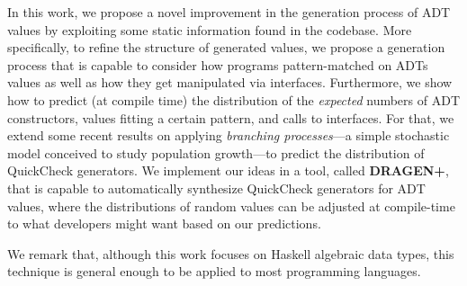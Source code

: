 \documentclass[conference, fleqn]{IEEEtran}
\newcommand{\dragenp}{\textbf{DRAGEN\!+}\xspace}
\begin{document}
In this work, we propose a novel improvement in the generation process of ADT
values by exploiting some static information found in the codebase.
%
More specifically, to refine the structure of generated values, we propose a
generation process that is capable to consider how programs pattern-matched on
ADTs values as well as how they get manipulated via interfaces.
%
Furthermore, we show how to predict (at compile time) the distribution of the
\emph{expected} numbers of ADT constructors, values fitting a certain pattern,
and calls to interfaces.
%
For that, we extend some recent results on applying \emph{branching
  processes}---a simple stochastic model conceived to study population
growth---to predict the distribution of QuickCheck
generators\cite{DBLP:conf/haskell/MistaRH18}.
%
We implement our ideas in a tool, called {\dragenp}, that is capable to
automatically synthesize QuickCheck generators for ADT values, where the
distributions of random values can be adjusted at compile-time to what
developers might want based on our predictions.
%

We remark that, although this work focuses on Haskell algebraic data types, this
technique is general enough to be applied to most programming languages.

\end{document}
